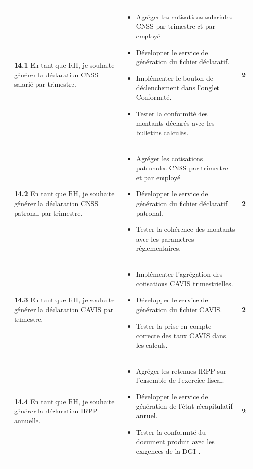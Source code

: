 \begin{small}
\begin{longtable}{|p{2.8cm}|p{6.2cm}|p{6.2cm}|c|}
& \textbf{14.1} En tant que RH, je souhaite générer la déclaration CNSS salarié par trimestre.
& \begin{itemize}[leftmargin=*, noitemsep, topsep=0pt]
    \item Agréger les cotisations salariales CNSS par trimestre et par employé.
    \item Développer le service de génération du fichier déclaratif.
    \item Implémenter le bouton de déclenchement dans l'onglet Conformité.
    \item Tester la conformité des montants déclarés avec les bulletins calculés.
  \end{itemize}
& \textbf{2} \\ 

& \textbf{14.2} En tant que RH, je souhaite générer la déclaration CNSS patronal par trimestre.
& \begin{itemize}[leftmargin=*, noitemsep, topsep=0pt]
    \item Agréger les cotisations patronales CNSS par trimestre et par employé.
    \item Développer le service de génération du fichier déclaratif patronal.
    \item Tester la cohérence des montants avec les paramètres réglementaires.
  \end{itemize}
& \textbf{2} \\ 

& \textbf{14.3} En tant que RH, je souhaite générer la déclaration CAVIS par trimestre.
& \begin{itemize}[leftmargin=*, noitemsep, topsep=0pt]
    \item Implémenter l'agrégation des cotisations CAVIS trimestrielles.
    \item Développer le service de génération du fichier CAVIS.
    \item Tester la prise en compte correcte des taux CAVIS dans les calculs.
  \end{itemize}
& \textbf{2} \\ 

& \textbf{14.4} En tant que RH, je souhaite générer la déclaration IRPP annuelle.
& \begin{itemize}[leftmargin=*, noitemsep, topsep=0pt]
    \item Agréger les retenues IRPP sur l'ensemble de l'exercice fiscal.
    \item Développer le service de génération de l'état récapitulatif annuel.
    \item Tester la conformité du document produit avec les exigences de la DGI~\cite{lf2026}.
  \end{itemize}
& \textbf{2} \\ \hline


\end{longtable}
\end{small}
